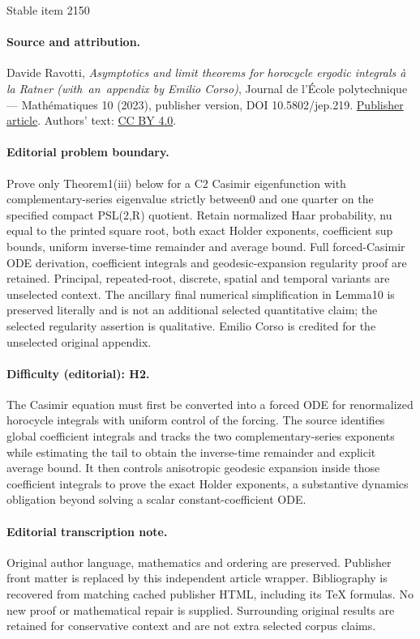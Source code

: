 \documentclass[11pt]{article}
\theoremstyle{definition}
\begin{document}
\begin{center}{\Large Stable item 2150}\end{center}
\paragraph{Source and attribution.}
Davide Ravotti, \emph{Asymptotics and limit theorems for horocycle ergodic integrals à la Ratner (with an appendix by Emilio Corso)}, Journal de l’École polytechnique — Mathématiques 10 (2023), publisher version, DOI 10.5802/jep.219. \href{https://jep.centre-mersenne.org/articles/10.5802/jep.219/}{Publisher article}. Authors' text: \href{https://creativecommons.org/licenses/by/4.0/}{CC BY 4.0}.
\paragraph{Editorial problem boundary.}
Prove only Theorem1(iii) below for a C2 Casimir eigenfunction with complementary-series eigenvalue strictly between0 and one quarter on the specified compact PSL(2,R) quotient. Retain normalized Haar probability, nu equal to the printed square root, both exact Holder exponents, coefficient sup bounds, uniform inverse-time remainder and average bound. Full forced-Casimir ODE derivation, coefficient integrals and geodesic-expansion regularity proof are retained. Principal, repeated-root, discrete, spatial and temporal variants are unselected context. The ancillary final numerical simplification in Lemma10 is preserved literally and is not an additional selected quantitative claim; the selected regularity assertion is qualitative. Emilio Corso is credited for the unselected original appendix.
\paragraph{Difficulty (editorial): H2.}
The Casimir equation must first be converted into a forced ODE for renormalized horocycle integrals with uniform control of the forcing. The source identifies global coefficient integrals and tracks the two complementary-series exponents while estimating the tail to obtain the inverse-time remainder and explicit average bound. It then controls anisotropic geodesic expansion inside those coefficient integrals to prove the exact Holder exponents, a substantive dynamics obligation beyond solving a scalar constant-coefficient ODE.
\paragraph{Editorial transcription note.}
Original author language, mathematics and ordering are preserved. Publisher front matter is replaced by this independent article wrapper. Bibliography is recovered from matching cached publisher HTML, including its TeX formulas. No new proof or mathematical repair is supplied. Surrounding original results are retained for conservative context and are not extra selected corpus claims.
\clearpage
\end{document}

